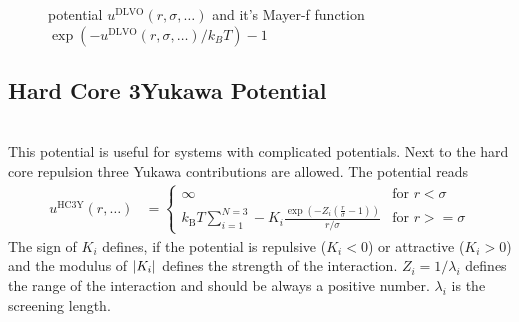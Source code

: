\begin{figure}[htb]
\captionsetup[subfigure]{position=b}
\centering
{}
\hfill
{}
\caption{potential $u^\text{DLVO}(r,\sigma,\ldots)$ and it's Mayer-f function $\exp(-u^\text{DLVO}(r,\sigma,\ldots)/k_BT)-1$}
\end{figure}

\newpage
\subsection{Hard Core 3Yukawa Potential}
~\\

This potential is useful for systems with complicated potentials. Next to the hard core repulsion three
Yukawa contributions are allowed. The potential reads
\begin{align}
u^\text{HC3Y}(r,\ldots) &=
\begin{cases}
\infty                                                                  & \mbox{for } r<   \sigma \\
k_\text{B} T
\displaystyle \sum_{i=1}^{N=3} -K_i\frac{\exp\left(-Z_i\left(\frac{r}{\sigma}-1\right)\right)}{r/\sigma}& \mbox{for } r >= \sigma
\end{cases}
\end{align}
The sign of $K_i$ defines, if the potential is
repulsive ($K_i<0$) or attractive ($K_i>0$) and the modulus of $\abs{K_i}$ defines the strength of the interaction. $Z_i=1/\lambda_i$ defines the range of the interaction and should be always a positive number. $\lambda_i$ is the screening length.


